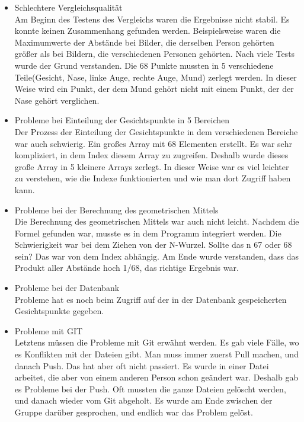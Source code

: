 \begin{itemize}
		Am Beginn war das Umgehen mit der Skripten Aufrufe sehr schwer. Es war schwer zu verstehen wie das genau funktionierte, weil die große Variablenanzahl die Arbeit kompliziert machte. Dieser Anzahl wurde reduziert und es wurden viele Recherchen an der korrekten Verwendung von der sys Pakete gemacht um das Problem zu l{\"o}sen.
		\item Schlechtere Vergleichsqualität \\
		
		Am Beginn des Testens des Vergleichs waren die Ergebnisse nicht stabil. Es konnte keinen Zusammenhang gefunden werden. Beispielsweise waren die Maximumwerte der Abstände bei Bilder, die derselben Person gehörten größer als bei Bildern, die verschiedenen Personen gehörten. Nach viele Tests wurde der Grund verstanden. Die 68 Punkte mussten in 5 verschiedene Teile(Gesicht, Nase, linke Auge, rechte Auge, Mund) zerlegt werden. In dieser Weise wird ein Punkt, der dem Mund gehört nicht mit einem Punkt, der der Nase gehört verglichen.
		\item Probleme bei Einteilung der Gesichtspunkte in 5 Bereichen \\
		
		Der Prozess der Einteilung der Gesichtspunkte in dem verschiedenen Bereiche war auch schwierig. Ein großes Array mit 68 Elementen erstellt. Es war sehr kompliziert, in dem Index diesem Array zu zugreifen. Deshalb wurde dieses große Array in 5 kleinere Arrays zerlegt. In dieser Weise war es viel leichter zu verstehen, wie die Indexe funktionierten und wie man dort Zugriff haben kann.
		\item Probleme bei der Berechnung des geometrischen Mittels \\
		
		Die Berechnung des geometrischen Mittels war auch nicht leicht. Nachdem die Formel gefunden war, musste es in dem Programm integriert werden. Die Schwierigkeit war bei dem Ziehen von der N-Wurzel. Sollte das n 67 oder 68 sein? Das war von dem Index abhängig. Am Ende wurde verstanden, dass das Produkt aller Abstände hoch 1/68, das richtige Ergebnis war.
		\item Probleme bei der Datenbank \\
		
		Probleme hat es noch beim Zugriff auf der in der Datenbank gespeicherten Gesichtspunkte gegeben. 
		\item Probleme mit GIT \\
		
		Letztens müssen die Probleme mit Git erwähnt werden. Es gab viele Fälle, wo es Konflikten mit der Dateien gibt. Man muss immer zuerst Pull machen, und danach Push. Das hat aber oft nicht passiert. Es wurde in einer Datei arbeitet, die aber von einem anderen Person schon geändert war. Deshalb gab es Probleme bei der Push. Oft mussten die ganze Dateien gelöscht werden, und danach wieder vom Git abgeholt. Es wurde am Ende zwischen der Gruppe darüber gesprochen, und endlich war das Problem gelöst.
	\end{itemize}

